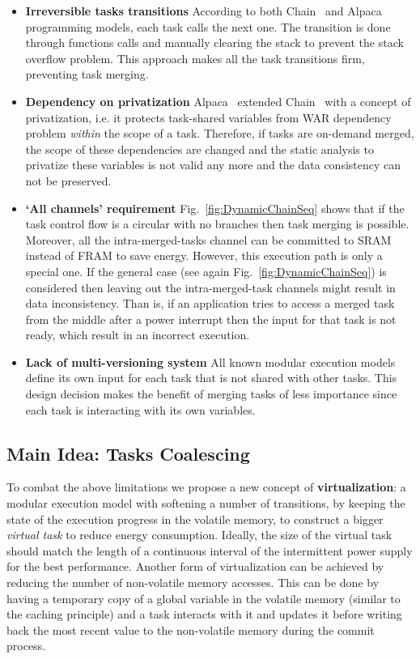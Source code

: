 \begin{itemize}
	\item \textbf{Irreversible tasks transitions} According to both Chain~\cite{chain} and Alpaca~\cite{alpaca} programming models, each task calls the next one. The transition is done through functions calls and manually clearing the stack to prevent the stack overflow problem. This approach makes all the task transitions firm, preventing task merging.

	\item \textbf{Dependency on privatization} Alpaca~\cite{alpaca} extended Chain~\cite{chain} with a concept of privatization, i.e. it protects task-shared variables from WAR dependency problem \emph{within} the scope of a task. Therefore, if tasks are on-demand merged, the scope of these dependencies are changed and the static analysis to privatize these variables is not valid any more and the data consistency can not be preserved.

	\item \textbf{`All channels' requirement} Fig.~\ref{fig:DynamicChainSeq} shows that if the task control flow is a circular with no branches then task merging is possible. Moreover, all the intra-merged-tasks channel can be committed to SRAM instead of FRAM to save energy. However, this execution path is only a special one. If the general case (see again Fig.~\ref{fig:DynamicChainSeq}) is considered then leaving out the intra-merged-task channels might result in data inconsistency. Than is, if an application tries to access a merged task from the middle after a power interrupt then the input for that task is not ready, which result in an incorrect execution.
	
	\item \textbf{Lack of multi-versioning system} All known modular execution models define its own input for each task that is not shared with other tasks. This design decision makes the benefit of merging tasks of less importance since each task is interacting with its own variables. 
\end{itemize}

\subsection{Main Idea: Tasks Coalescing}

To combat the above limitations we propose a new concept of \textbf{virtualization}: a modular execution model with softening a number of transitions, by keeping the state of the execution progress in the volatile memory, to construct a bigger \emph{virtual task} to reduce energy consumption. Ideally, the size of the virtual task should match the length of a continuous interval of the intermittent power supply for the best performance. Another form of virtualization can be achieved by reducing the number of non-volatile memory accesses. This can be done by having a temporary copy of a global variable in the volatile memory (similar to the caching principle) and a task interacts with it and updates it before writing back the most recent value to the non-volatile memory during the commit process.

